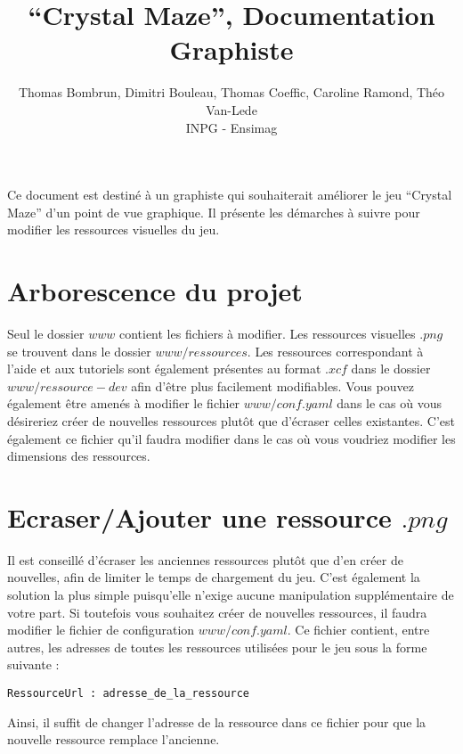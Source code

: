 \documentclass[11pt, english]{article}
\begin{document}
\title{\enquote{Crystal Maze}, Documentation Graphiste}
\author{Thomas Bombrun, Dimitri Bouleau, Thomas Coeffic, Caroline Ramond, Théo Van-Lede\\
INPG - Ensimag}
\renewcommand{\today}{17 Juin 2014}
\maketitle

Ce document est destiné à un graphiste qui souhaiterait améliorer le jeu \enquote{Crystal Maze} d'un point de vue graphique. Il présente les démarches à suivre pour modifier les ressources visuelles du jeu.

\section{Arborescence du projet}
Seul le dossier $www$ contient les fichiers à modifier. Les ressources visuelles $.png$ se trouvent dans le dossier $www/ressources$. Les ressources correspondant à l'aide et aux tutoriels sont également présentes au format $.xcf$ dans le dossier $www/ressource-dev$ afin d'être plus facilement modifiables. Vous pouvez également être amenés à modifier le fichier $www/conf.yaml$ dans le cas où vous désireriez créer de nouvelles ressources plutôt que d'écraser celles existantes. C'est également ce fichier qu'il faudra modifier dans le cas où vous voudriez modifier les dimensions des ressources.

\section{Ecraser/Ajouter une ressource $.png$}
Il est conseillé d'écraser les anciennes ressources plutôt que d'en créer de nouvelles, afin de limiter le temps de chargement du jeu. C'est également la solution la plus simple puisqu'elle n'exige aucune manipulation supplémentaire de votre part. Si toutefois vous souhaitez créer de nouvelles ressources, il faudra modifier le fichier de configuration $www/conf.yaml$. Ce fichier contient, entre autres, les adresses de toutes les ressources utilisées pour le jeu sous la forme suivante : \\
\begin{verbatim}
RessourceUrl : adresse_de_la_ressource
\end{verbatim}
Ainsi, il suffit de changer l'adresse de la ressource dans ce fichier pour que la nouvelle ressource remplace l'ancienne.
\end{document}
